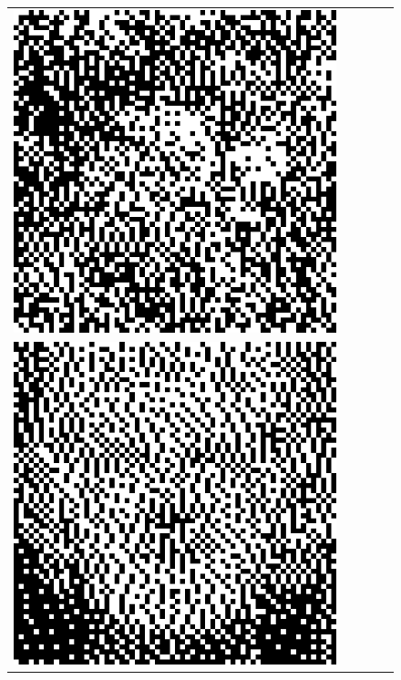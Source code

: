 \begin{figure}
\begin{tabular}{c c c c c}
		\includegraphics[width=\tilewidth,interpolate=false]{media/chp2/associative_memory/hopfield/05_04_activation_scaled_crushed.png}\\%
		\includegraphics[width=\tilewidth,interpolate=false]{media/chp2/associative_memory/hopfield/06_00_orig_scaled_crushed.png}&%

\end{tabular}
\end{figure}
